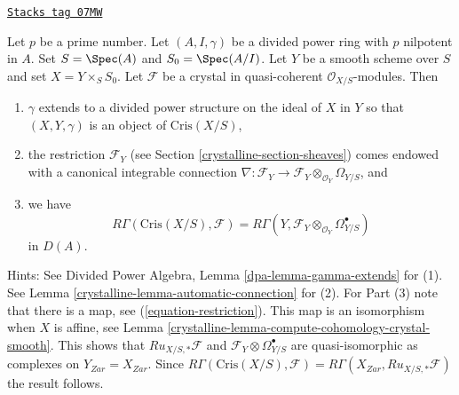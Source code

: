 \begin{remark}[Comparison]

\label{crystalline-remark-comparison}
\href{https://stacks.math.columbia.edu/tag/07MW}{\texttt{Stacks tag 07MW}}

Let $p$ be a prime number. Let $(A, I, \gamma)$ be a divided power
ring with $p$ nilpotent in $A$. Set $S = \Spec(A)$ and
$S_0 = \Spec(A/I)$. Let $Y$ be a smooth scheme over $S$ and set
$X = Y \times_S S_0$. Let
$\mathcal{F}$ be a crystal in quasi-coherent $\mathcal{O}_{X/S}$-modules.
Then
\begin{enumerate}
\item $\gamma$ extends to a divided power structure on the ideal
of $X$ in $Y$ so that $(X, Y, \gamma)$ is an object of $\text{Cris}(X/S)$,
\item the restriction $\mathcal{F}_Y$ (see Section \ref{crystalline-section-sheaves})
comes endowed with a canonical integrable connection
$\nabla : \mathcal{F}_Y \to
\mathcal{F}_Y \otimes_{\mathcal{O}_Y} \Omega_{Y/S}$, and
\item we have
$$
R\Gamma(\text{Cris}(X/S), \mathcal{F}) =
R\Gamma(Y, \mathcal{F}_Y \otimes_{\mathcal{O}_Y} \Omega^\bullet_{Y/S})
$$
in $D(A)$.
\end{enumerate}
Hints: See Divided Power Algebra, Lemma \ref{dpa-lemma-gamma-extends} for (1).
See Lemma \ref{crystalline-lemma-automatic-connection} for (2).
For Part (3) note that there is a map, see
(\ref{equation-restriction}). This map is an isomorphism when
$X$ is affine, see
Lemma \ref{crystalline-lemma-compute-cohomology-crystal-smooth}.
This shows that $Ru_{X/S, *}\mathcal{F}$ and
$\mathcal{F}_Y \otimes \Omega^\bullet_{Y/S}$ are quasi-isomorphic
as complexes on $Y_{Zar} = X_{Zar}$.
Since $R\Gamma(\text{Cris}(X/S), \mathcal{F}) =
R\Gamma(X_{Zar}, Ru_{X/S, *}\mathcal{F})$ the result follows.
\end{remark}

